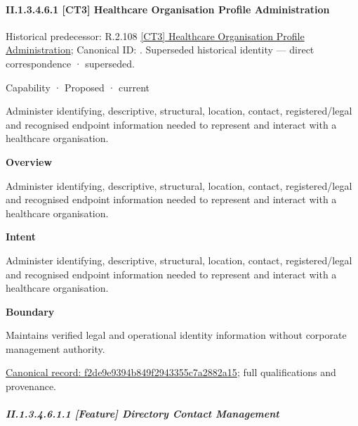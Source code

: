 \paragraph*{II.1.3.4.6.1 [CT3] Healthcare Organisation Profile Administration}
\label{navigation:II.1.3.4.6.1}

{\small Historical predecessor: R.2.108 \hyperref[element:e485424b799c42aca7399d341ca02d0b]{[CT3] Healthcare Organisation Profile Administration}; Canonical ID: \texttt{}. Superseded historical identity — direct correspondence · superseded.}\par
\label{element:f2de9e9394b849f2943355c7a2882a15}
{\small Capability · Proposed · current}\par

Administer identifying, descriptive, structural, location, contact, registered/legal and recognised endpoint information needed to represent and interact with a healthcare organisation.



\textbf{Overview}



Administer identifying, descriptive, structural, location, contact, registered/legal and recognised endpoint information needed to represent and interact with a healthcare organisation.



\textbf{Intent}



Administer identifying, descriptive, structural, location, contact, registered/legal and recognised endpoint information needed to represent and interact with a healthcare organisation.



\textbf{Boundary}



Maintains verified legal and operational identity information without corporate management authority.


{\footnotesize \href{../../../../../../../continuum/strategy/capability/f2de9e9394b849f2943355c7a2882a15.md}{Canonical record: f2de9e9394b849f2943355c7a2882a15}; full qualifications and provenance.}\par
\subparagraph*{II.1.3.4.6.1.1 [Feature] Directory Contact Management}
\label{navigation:II.1.3.4.6.1.1}

